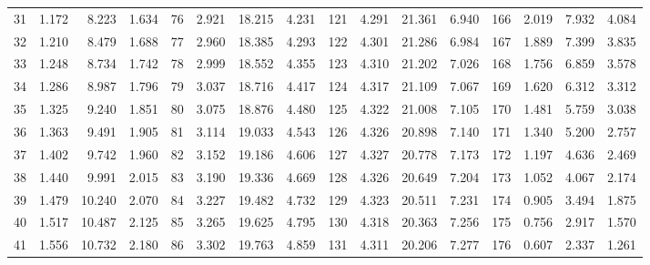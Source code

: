 \begin{table}
{\begin{tabular}{rrrr|rrrr|rrrr|rrrr}
 31 & \tiny{  1.172} &   8.223 & \tiny{  1.634} &  76 & \tiny{  2.921} &  18.215 & \tiny{  4.231} & 121 & \tiny{  4.291} &  21.361 & \tiny{  6.940} & 166 & \tiny{  2.019} &   7.932 & \tiny{  4.084}\\
 32 & \tiny{  1.210} &   8.479 & \tiny{  1.688} &  77 & \tiny{  2.960} &  18.385 & \tiny{  4.293} & 122 & \tiny{  4.301} &  21.286 & \tiny{  6.984} & 167 & \tiny{  1.889} &   7.399 & \tiny{  3.835}\\
 33 & \tiny{  1.248} &   8.734 & \tiny{  1.742} &  78 & \tiny{  2.999} &  18.552 & \tiny{  4.355} & 123 & \tiny{  4.310} &  21.202 & \tiny{  7.026} & 168 & \tiny{  1.756} &   6.859 & \tiny{  3.578}\\
 34 & \tiny{  1.286} &   8.987 & \tiny{  1.796} &  79 & \tiny{  3.037} &  18.716 & \tiny{  4.417} & 124 & \tiny{  4.317} &  21.109 & \tiny{  7.067} & 169 & \tiny{  1.620} &   6.312 & \tiny{  3.312}\\
 35 & \tiny{  1.325} &   9.240 & \tiny{  1.851} &  80 & \tiny{  3.075} &  18.876 & \tiny{  4.480} & 125 & \tiny{  4.322} &  21.008 & \tiny{  7.105} & 170 & \tiny{  1.481} &   5.759 & \tiny{  3.038}\\
 36 & \tiny{  1.363} &   9.491 & \tiny{  1.905} &  81 & \tiny{  3.114} &  19.033 & \tiny{  4.543} & 126 & \tiny{  4.326} &  20.898 & \tiny{  7.140} & 171 & \tiny{  1.340} &   5.200 & \tiny{  2.757}\\
 37 & \tiny{  1.402} &   9.742 & \tiny{  1.960} &  82 & \tiny{  3.152} &  19.186 & \tiny{  4.606} & 127 & \tiny{  4.327} &  20.778 & \tiny{  7.173} & 172 & \tiny{  1.197} &   4.636 & \tiny{  2.469}\\
 38 & \tiny{  1.440} &   9.991 & \tiny{  2.015} &  83 & \tiny{  3.190} &  19.336 & \tiny{  4.669} & 128 & \tiny{  4.326} &  20.649 & \tiny{  7.204} & 173 & \tiny{  1.052} &   4.067 & \tiny{  2.174}\\
 39 & \tiny{  1.479} &  10.240 & \tiny{  2.070} &  84 & \tiny{  3.227} &  19.482 & \tiny{  4.732} & 129 & \tiny{  4.323} &  20.511 & \tiny{  7.231} & 174 & \tiny{  0.905} &   3.494 & \tiny{  1.875}\\
 40 & \tiny{  1.517} &  10.487 & \tiny{  2.125} &  85 & \tiny{  3.265} &  19.625 & \tiny{  4.795} & 130 & \tiny{  4.318} &  20.363 & \tiny{  7.256} & 175 & \tiny{  0.756} &   2.917 & \tiny{  1.570}\\
 41 & \tiny{  1.556} &  10.732 & \tiny{  2.180} &  86 & \tiny{  3.302} &  19.763 & \tiny{  4.859} & 131 & \tiny{  4.311} &  20.206 & \tiny{  7.277} & 176 & \tiny{  0.607} &   2.337 & \tiny{  1.261}\\

\end{tabular}}
\end{table}

